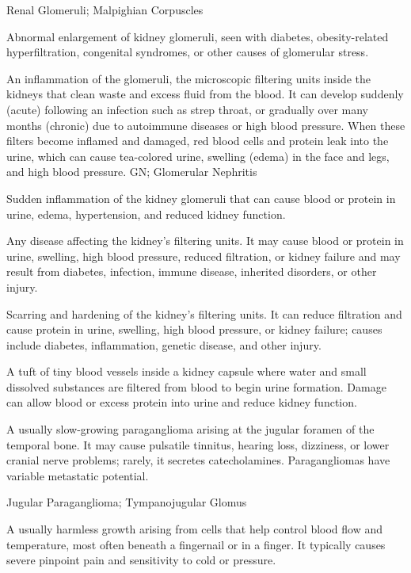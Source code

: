 \synonyms
Renal Glomeruli; Malpighian Corpuscles

 Abnormal enlargement of kidney glomeruli, seen with diabetes, obesity-related hyperfiltration, congenital syndromes, or other causes of glomerular stress.

 An inflammation of the glomeruli, the microscopic filtering units inside the kidneys that clean waste and excess fluid from the blood. It can develop suddenly (acute) following an infection such as strep throat, or gradually over many months (chronic) due to autoimmune diseases or high blood pressure. When these filters become inflamed and damaged, red blood cells and protein leak into the urine, which can cause tea-colored urine, swelling (edema) in the face and legs, and high blood pressure.
\synonyms
GN; Glomerular Nephritis

 Sudden inflammation of the kidney glomeruli that can cause blood or protein in urine, edema, hypertension, and reduced kidney function.

 Any disease affecting the kidney’s filtering units. It may cause blood or protein in urine, swelling, high blood pressure, reduced filtration, or kidney failure and may result from diabetes, infection, immune disease, inherited disorders, or other injury.

 Scarring and hardening of the kidney’s filtering units. It can reduce filtration and cause protein in urine, swelling, high blood pressure, or kidney failure; causes include diabetes, inflammation, genetic disease, and other injury.

 A tuft of tiny blood vessels inside a kidney capsule where water and small dissolved substances are filtered from blood to begin urine formation. Damage can allow blood or excess protein into urine and reduce kidney function.

 A usually slow-growing paraganglioma arising at the jugular foramen of the temporal bone. It may cause pulsatile tinnitus, hearing loss, dizziness, or lower cranial nerve problems; rarely, it secretes catecholamines. Paragangliomas have variable metastatic potential.

\synonyms
Jugular Paraganglioma; Tympanojugular Glomus

 A usually harmless growth arising from cells that help control blood flow and temperature, most often beneath a fingernail or in a finger. It typically causes severe pinpoint pain and sensitivity to cold or pressure.

